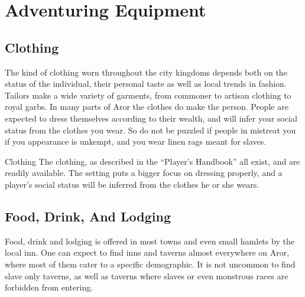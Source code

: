 \chapter{Adventuring Equipment}
\label{sec:Adventuring Equipment}



\section{Clothing}
\label{sec:Clothing}

The kind of clothing worn throughout the city kingdoms depends both on the
status of the individual, their personal taste as well as local trends in
fashion.  Tailors make a wide variety of garments, from commoner to artisan
clothing to royal garbs. In many parts of Aror the clothes do make the
person. People are expected to dress themselves according to their wealth, and
will infer your social status from the clothes you wear. So do not be puzzled
if people in  mistreat you if you appearance is unkempt,
and you wear linen rags meant for slaves.

\begin{35e}{Clothing}
  The clothing, as described in the ``Player's Handbook'' all exist, and
  are readily available. The setting puts a bigger focus on dressing properly,
  and a player's social status will be inferred from the clothes he or she
  wears.
\end{35e}









\section{Food, Drink, And Lodging}
\label{sec:Food}

Food, drink and lodging is offered in most towns and even small hamlets by
the local inn. One can expect to find inns and taverns almost everywhere on
Aror, where most of them cater to a specific demographic. It is not uncommon
to find slave only taverns, as well as taverns where slaves or even monstrous
races are forbidden from entering.

